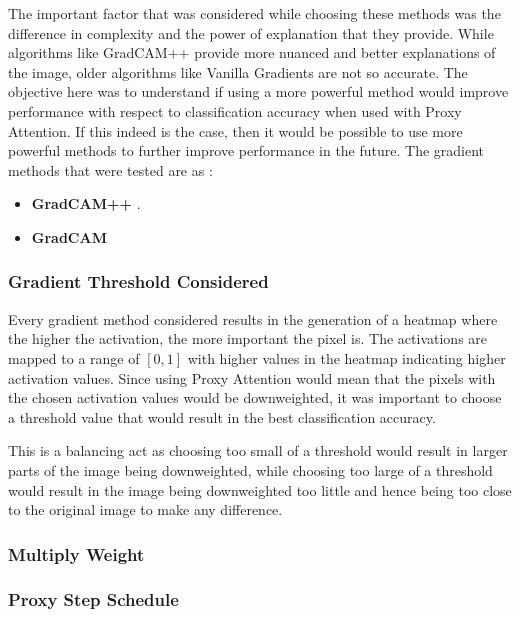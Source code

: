The important factor that was considered while choosing these methods was the difference in complexity and the power of explanation that they provide. While algorithms like GradCAM++ \cite{chattopadhayGradCAMGeneralizedGradientBased2018} provide more nuanced and better explanations of the image, older algorithms like Vanilla Gradients \cite{zeilerVisualizingUnderstandingConvolutional2013} are not so accurate. The objective here was to understand if using a more powerful method would improve performance with respect to classification accuracy when used with Proxy Attention. If this indeed is the case, then it would be possible to use more powerful methods to further improve performance in the future.
The gradient methods that were tested are as :
\begin{itemize}
    \item \textbf{GradCAM++} \cite{chattopadhayGradCAMGeneralizedGradientBased2018}.
    \item \textbf{GradCAM} \cite{selvarajuGradCAMVisualExplanations}
\end{itemize}

\subsubsection{Gradient Threshold Considered}
Every gradient method considered results in the generation of a heatmap where the higher the activation, the more important the pixel is. The activations are mapped to a range of $[0,1]$ with higher values in the heatmap indicating higher activation values. Since using Proxy Attention would mean that the pixels with the chosen activation values would be downweighted, it was important to choose a threshold value that would result in the best classification accuracy.

This is a balancing act as choosing too small of a threshold would result in larger parts of the image being downweighted, while choosing too large of a threshold would result in the image being downweighted too little and hence being too close to the original image to make any difference.


\subsubsection{Multiply Weight}

\subsubsection{Proxy Step Schedule}

